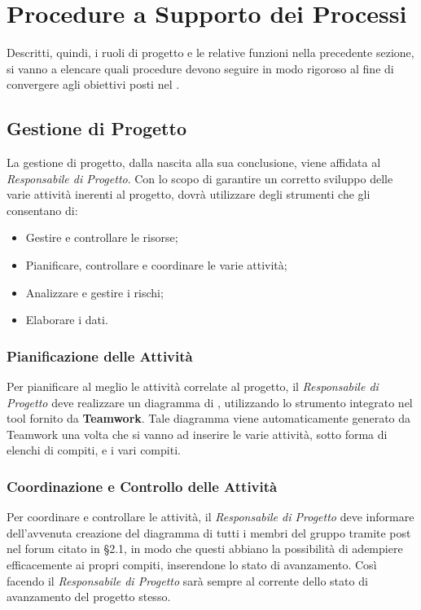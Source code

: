 \section{Procedure a Supporto dei Processi}

Descritti, quindi, i ruoli di progetto e le relative funzioni nella precedente sezione, si vanno a elencare quali procedure devono seguire in modo rigoroso al fine di convergere agli obiettivi posti nel \PianoDiQualifica.

\subsection{Gestione di Progetto}

La gestione di progetto, dalla nascita alla sua conclusione, viene affidata al \textit{Responsabile di Progetto}. Con lo scopo di garantire un corretto sviluppo delle varie attività inerenti al progetto, dovrà utilizzare degli strumenti che gli consentano di:

\begin{itemize}
\item Gestire e controllare le risorse;
\item Pianificare, controllare e coordinare le varie attività;
\item Analizzare e gestire i rischi;
\item Elaborare i dati.
\end{itemize}

\subsubsection{Pianificazione delle Attività}
Per pianificare al meglio le attività correlate al progetto, il \textit{Responsabile di Progetto} deve realizzare un diagramma di , utilizzando lo strumento integrato nel tool fornito da \textbf{Teamwork}. Tale diagramma viene automaticamente generato da Teamwork una volta che si vanno ad inserire le varie attività, sotto forma di elenchi di compiti, e i vari compiti.

\subsubsection{Coordinazione e Controllo delle Attività}
Per coordinare e controllare le attività, il \textit{Responsabile di Progetto} deve informare dell'avvenuta creazione del diagramma di  tutti i membri del gruppo tramite post nel forum citato in §2.1, in modo che questi abbiano la possibilità di adempiere efficacemente ai propri compiti, inserendone lo stato di avanzamento. Così facendo il \textit{Responsabile di Progetto} sarà sempre al corrente dello stato di avanzamento del progetto stesso.

